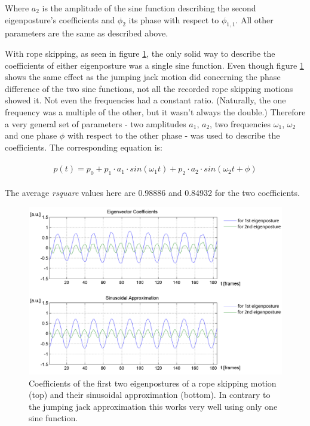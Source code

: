 \documentclass[a4paper]{article}
\begin{document}
Where $a_{2}$ is the amplitude of the sine function describing the second eigenposture's coefficients and $\phi_{2}$ its phase with respect to $\phi_{1,1}$. All other parameters are the same as described above.

With rope skipping, as seen in figure \ref{fig:approx3}, the only solid way to describe the coefficients of either eigenposture was a single sine function.
Even though figure \ref{fig:approx3} shows the same effect as the jumping jack motion did concerning the phase difference of the two sine functions, not all the recorded rope skipping motions showed it.
Not even the frequencies had a constant ratio.
(Naturally, the one frequency was a multiple of the other, but it wasn't always the double.)
Therefore a very general set of parameters - two amplitudes $a_{1}$, $a_{2}$, two frequencies $\omega_{1}$, $\omega_{2}$ and one phase $\phi$ with respect to the other phase - was used to describe the coefficients. The corresponding equation is:

\begin{align}
	\begin{aligned}
		p(t) = p_{0} + p_{1} \cdot a_{1} \cdot sin(\omega_{1} t) + p_{2} \cdot a_{2} \cdot sin(\omega_{2} t + \phi)
	\end{aligned}
	\label{eq:approxPostureSinRope}
\end{align}

The average \emph{rsquare} values here are 0.98886 and 0.84932 for the two coefficients.

\begin{figure}
		\centering
		\includegraphics[width=\textwidth]{1sinSeil.png}
		\caption{Coefficients of the first two eigenpostures of a rope skipping motion (top) and their sinusoidal approximation (bottom).
		In contrary to the jumping jack approximation this works very well using only one sine function.}
		\label{fig:approx3}
\end{figure}
\end{document}
